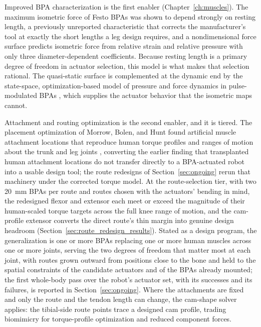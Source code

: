 Improved BPA characterization is the first enabler (Chapter~\ref{ch:muscles}). The maximum isometric force of Festo BPAs was shown to depend strongly on resting length, a previously unreported characteristic that corrects the manufacturer's tool at exactly the short lengths a leg design requires, and a nondimensional force surface predicts isometric force from relative strain and relative pressure with only three diameter-dependent coefficients. Because resting length is a primary degree of freedom in actuator selection, this model is what makes that selection rational. The quasi-static surface is complemented at the dynamic end by the state-space, optimization-based model of pressure and force dynamics in pulse-modulated BPAs \citep{elzein_pressure_2025}, which supplies the actuator behavior that the isometric maps cannot.

Attachment and routing optimization is the second enabler, and it is tiered. The placement optimization of Morrow, Bolen, and Hunt found artificial muscle attachment locations that reproduce human torque profiles and ranges of motion about the trunk and leg joints \citep{morrow_optimization_2020}, converting the earlier finding that transplanted human attachment locations do not transfer directly to a BPA-actuated robot \citep{bolen_bipedal_2019, bolen_determination_2019} into a usable design tool; the route redesigns of Section~\ref{sec:ongoing} rerun that machinery under the corrected torque model. At the route-selection tier, with two \qty{20}{\mm} BPAs per route and routes chosen with the actuators' bending in mind, the redesigned flexor and extensor each meet or exceed the magnitude of their human-scaled torque targets across the full knee range of motion, and the cam-profile extensor converts the direct route's thin margin into genuine design headroom (Section~\ref{sec:route_redesign_results}). Stated as a design program, the generalization is one or more BPAs replacing one or more human muscles across one or more joints, serving the two degrees of freedom that matter most at each joint, with routes grown outward from positions close to the bone and held to the spatial constraints of the candidate actuators and of the BPAs already mounted; the first whole-body pass over the robot's actuator set, with its successes and its failures, is reported in Section~\ref{sec:ongoing}. Where the attachments are fixed and only the route and the tendon length can change, the cam-shape solver applies: the tibial-side route points trace a designed cam profile, trading biomimicry for torque-profile optimization and reduced component forces.


